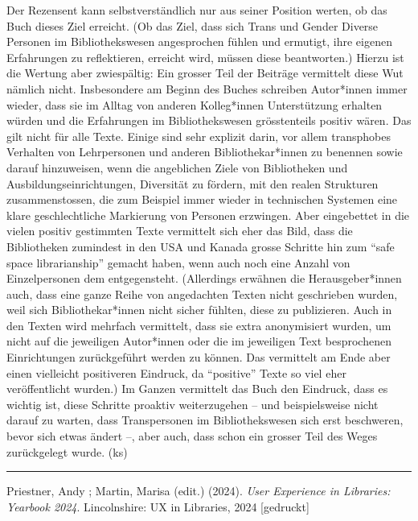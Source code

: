 \documentclass[a4paper,
fontsize=11pt,
oneside,
numbers=noperiodatend,
parskip=half-,
bibliography=totoc,
final
]{scrartcl}
\begin{document}
Der Rezensent kann selbstverständlich nur aus seiner Position werten, ob
das Buch dieses Ziel erreicht. (Ob das Ziel, dass sich Trans und Gender
Diverse Personen im Bibliothekswesen angesprochen fühlen und ermutigt,
ihre eigenen Erfahrungen zu reflektieren, erreicht wird, müssen diese
beantworten.) Hierzu ist die Wertung aber zwiespältig: Ein grosser Teil
der Beiträge vermittelt diese Wut nämlich nicht. Insbesondere am Beginn
des Buches schreiben Autor*innen immer wieder, dass sie im Alltag von
anderen Kolleg*innen Unterstützung erhalten würden und die Erfahrungen
im Bibliothekswesen grösstenteils positiv wären. Das gilt nicht für alle
Texte. Einige sind sehr explizit darin, vor allem transphobes Verhalten
von Lehrpersonen und anderen Bibliothekar*innen zu benennen sowie darauf
hinzuweisen, wenn die angeblichen Ziele von Bibliotheken und
Ausbildungseinrichtungen, Diversität zu fördern, mit den realen
Strukturen zusammenstossen, die zum Beispiel immer wieder in technischen
Systemen eine klare geschlechtliche Markierung von Personen erzwingen.
Aber eingebettet in die vielen positiv gestimmten Texte vermittelt sich
eher das Bild, dass die Bibliotheken zumindest in den USA und Kanada
grosse Schritte hin zum \enquote{safe space librarianship} gemacht
haben, wenn auch noch eine Anzahl von Einzelpersonen dem entgegensteht.
(Allerdings erwähnen die Herausgeber*innen auch, dass eine ganze Reihe
von angedachten Texten nicht geschrieben wurden, weil sich
Bibliothekar*innen nicht sicher fühlten, diese zu publizieren. Auch in
den Texten wird mehrfach vermittelt, dass sie extra anonymisiert wurden,
um nicht auf die jeweiligen Autor*innen oder die im jeweiligen Text
besprochenen Einrichtungen zurückgeführt werden zu können. Das
vermittelt am Ende aber einen vielleicht positiveren Eindruck, da
\enquote{positive} Texte so viel eher veröffentlicht wurden.) Im Ganzen
vermittelt das Buch den Eindruck, dass es wichtig ist, diese Schritte
proaktiv weiterzugehen – und beispielsweise nicht darauf zu warten, dass
Transpersonen im Bibliothekswesen sich erst beschweren, bevor sich etwas
ändert –, aber auch, dass schon ein grosser Teil des Weges zurückgelegt
wurde. (ks)

\begin{center}\rule{0.5\linewidth}{0.5pt}\end{center}

Priestner, Andy ; Martin, Marisa (edit.) (2024). \emph{User Experience
in Libraries: Yearbook 2024}. Lincolnshire: UX in Libraries, 2024
{[}gedruckt{]}
\end{document}

